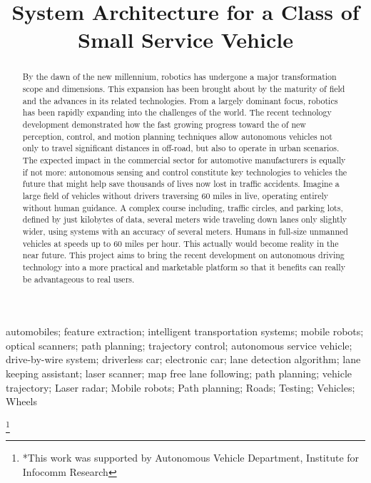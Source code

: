 \documentclass[conference]{IEEEtran}
\title{System Architecture for a Class of Small Service Vehicle}
\author{
            \IEEEauthorblockN{Saputra, V. B.}
        \IEEEauthorblockA{%
            Institute for Infocomm Research \\
            Singapore \\
            saputravb@i2r.a-star.edu.sg}
         \and
            \IEEEauthorblockN{Ravichandiran, B.}
        \IEEEauthorblockA{%
            Institute for Infocomm Research \\
            Singapore \\
            ravib@i2r.a-star.edu.sg}
        }
\date{}
\begin{document}
\maketitle

\begin{abstract}
By the dawn of the new millennium, robotics has undergone a major
transformation scope and dimensions. This expansion has been brought
about by the maturity of field and the advances in its related
technologies. From a largely dominant focus, robotics has been rapidly
expanding into the challenges of the world. The recent technology
development demonstrated how the fast growing progress toward the of new
perception, control, and motion planning techniques allow autonomous
vehicles not only to travel significant distances in off-road, but also
to operate in urban scenarios. The expected impact in the commercial
sector for automotive manufacturers is equally if not more: autonomous
sensing and control constitute key technologies to vehicles the future
that might help save thousands of lives now lost in traffic accidents.
Imagine a large field of vehicles without drivers traversing 60 miles in
live, operating entirely without human guidance. A complex course
including, traffic circles, and parking lots, defined by just kilobytes
of data, several meters wide traveling down lanes only slightly wider,
using systems with an accuracy of several meters. Humans in full-size
unmanned vehicles at speeds up to 60 miles per hour. This actually would
become reality in the near future. This project aims to bring the recent
development on autonomous driving technology into a more practical and
marketable platform so that it benefits can really be advantageous to
real users.
\end{abstract}

\begin{IEEEkeywords}
    automobiles;
    feature extraction;
    intelligent transportation systems;
    mobile robots;
    optical scanners;
    path planning;
    trajectory control;
    autonomous service vehicle;
    drive-by-wire system;
    driverless car;
    electronic car;
    lane detection algorithm;
    lane keeping assistant;
    laser scanner;
    map free lane following;
    path planning;
    vehicle trajectory;
    Laser radar;
    Mobile robots;
    Path planning;
    Roads;
    Testing;
    Vehicles;
    Wheels\end{IEEEkeywords}



\thanks{*This work was supported by Autonomous Vehicle Department, Institute for Infocomm Research}
\end{document}
